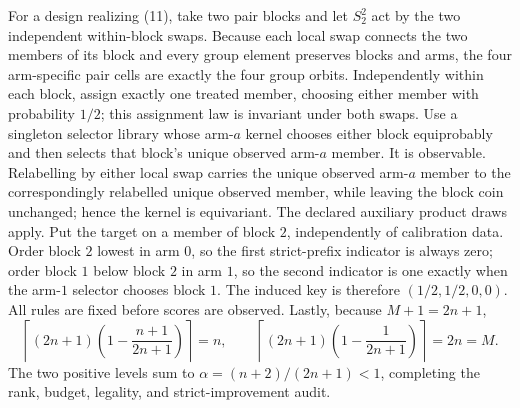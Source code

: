 For a design realizing (11), take two pair blocks and let \(S_2^2\) act by the two independent within-block swaps. Because each local swap connects the two members of its block and every group element preserves blocks and arms, the four arm-specific pair cells are exactly the four group orbits. Independently within each block, assign exactly one treated member, choosing either member with probability \(1/2\); this assignment law is invariant under both swaps. Use a singleton selector library whose arm-\(a\) kernel chooses either block equiprobably and then selects that block's unique observed arm-\(a\) member. It is observable. Relabelling by either local swap carries the unique observed arm-\(a\) member to the correspondingly relabelled unique observed member, while leaving the block coin unchanged; hence the kernel is equivariant. The declared auxiliary product draws apply. Put the target on a member of block \(2\), independently of calibration data. Order block \(2\) lowest in arm \(0\), so the first strict-prefix indicator is always zero; order block \(1\) below block \(2\) in arm \(1\), so the second indicator is one exactly when the arm-\(1\) selector chooses block \(1\). The induced key is therefore \((1/2,1/2,0,0)\). All rules are fixed before scores are observed. Lastly, because \(M+1=2n+1\),
\[
\left\lceil(2n+1)\left(1-\frac{n+1}{2n+1}\right)\right\rceil=n,\qquad
\left\lceil(2n+1)\left(1-\frac1{2n+1}\right)\right\rceil=2n=M.
\tag{12}
\]
The two positive levels sum to \(\alpha=(n+2)/(2n+1)<1\), completing the rank, budget, legality, and strict-improvement audit.